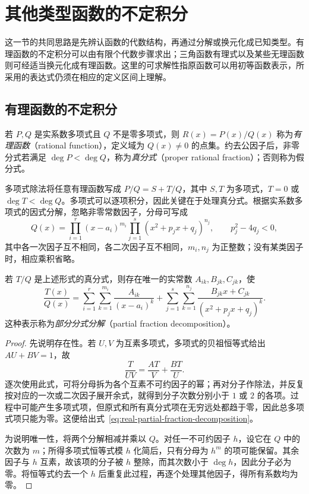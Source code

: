 \section{其他类型函数的不定积分}
\label{sec:indefinite-integrals-of-other-functions}

这一节的共同思路是先辨认函数的代数结构，再通过分解或换元化成已知类型。有理函数的不定积分可以由有限个代数步骤求出；三角函数有理式以及某些无理函数则可经适当换元化成有理函数。这里的可求解性指原函数可以用初等函数表示，所采用的表达式仍须在相应的定义区间上理解。

\subsection{有理函数的不定积分}
\label{subsec:integrals-of-rational-functions}

\begin{definition}
\label{def:rational-function-and-proper-fraction}
若 $P,Q$ 是实系数多项式且 $Q$ 不是零多项式，则 $R(x)=P(x)/Q(x)$ 称为\emph{有理函数}（rational function），定义域为 $Q(x)\neq0$ 的点集。约去公因子后，非零分式若满足 $\deg P<\deg Q$，称为\emph{真分式}（proper rational fraction）；否则称为假分式。
\end{definition}

多项式除法将任意有理函数写成 $P/Q=S+T/Q$，其中 $S,T$ 为多项式，$T=0$ 或 $\deg T<\deg Q$。多项式可以逐项积分，因此关键在于处理真分式。根据实系数多项式的因式分解，忽略非零常数因子，分母可写成
\[
    Q(x)=\prod_{i=1}^r(x-a_i)^{m_i}
           \prod_{j=1}^s(x^2+p_jx+q_j)^{n_j},
    \qquad p_j^2-4q_j<0,
\]
其中各一次因子互不相同，各二次因子互不相同，$m_i,n_j$ 为正整数；没有某类因子时，相应乘积省略。

\begin{theorem}[部分分式分解]
\label{thm:real-partial-fraction-decomposition}
若 $T/Q$ 是上述形式的真分式，则存在唯一的实常数 $A_{ik},B_{jk},C_{jk}$，使
\begin{equation}
    \frac{T(x)}{Q(x)}
       =\sum_{i=1}^r\sum_{k=1}^{m_i}\frac{A_{ik}}{(x-a_i)^k}
        +\sum_{j=1}^s\sum_{k=1}^{n_j}
           \frac{B_{jk}x+C_{jk}}{(x^2+p_jx+q_j)^k}.
    \label{eq:real-partial-fraction-decomposition}
\end{equation}
这种表示称为\emph{部分分式分解}（partial fraction decomposition）。
\end{theorem}

\begin{proof}
先说明存在性。若 $U,V$ 为互素多项式，多项式的贝祖恒等式给出 $AU+BV=1$，故
\[
    \frac{T}{UV}=\frac{AT}{V}+\frac{BT}{U}.
\]
逐次使用此式，可将分母拆为各个互素不可约因子的幂；再对分子作除法，并反复按对应的一次或二次因子展开余式，就得到分子次数分别小于 $1$ 或 $2$ 的各项。过程中可能产生多项式项，但原式和所有真分式项在无穷远处都趋于零，因此总多项式项只能为零。这便给出式~\eqref{eq:real-partial-fraction-decomposition}。

为说明唯一性，将两个分解相减并乘以 $Q$。对任一不可约因子 $h$，设它在 $Q$ 中的次数为 $m$；所得多项式恒等式模 $h$ 化简后，只有分母为 $h^m$ 的项可能保留。其余因子与 $h$ 互素，故该项的分子被 $h$ 整除，而其次数小于 $\deg h$，因此分子必为零。将恒等式约去一个 $h$ 后重复此过程，再逐个处理其他因子，得所有系数均为零。
\end{proof}

